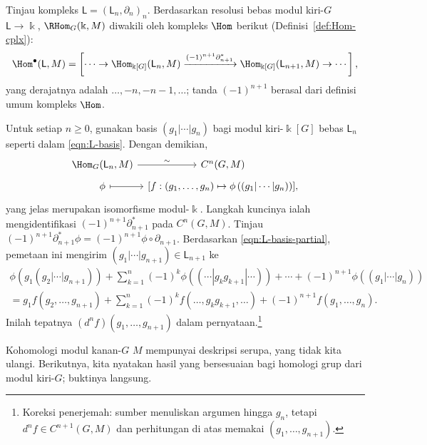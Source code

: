 \begin{bukti}
	Tinjau kompleks $\mathsf{L}=(\mathsf{L}_n,\partial_n)_n$. Berdasarkan
	resolusi bebas modul kiri-$G$ $\mathsf{L}\to\Bbbk$,
	$\RHom_G(\Bbbk,M)$ diwakili oleh kompleks $\Hom$ berikut
	(Definisi~\ref{def:Hom-cplx}):
	\begin{equation*}
		\Hom^\bullet(\mathsf{L}, M) = \left[ \cdots \to \Hom_{\Bbbk[G]}(\mathsf{L}_n, M) \xrightarrow{(-1)^{n+1} \partial_{n+1}^*} \Hom_{\Bbbk[G]}(\mathsf{L}_{n+1}, M) \to \cdots \right] ,
	\end{equation*}
	yang derajatnya adalah $\ldots,-n,-n-1,\ldots$; tanda $(-1)^{n+1}$
	berasal dari definisi umum kompleks $\Hom$.
	
	Untuk setiap $n\geq0$, gunakan basis
	$(g_1|\cdots|g_n)$ bagi modul kiri-$\Bbbk[G]$ bebas $\mathsf{L}_n$
	seperti dalam \eqref{eqn:L-basis}. Dengan demikian,
	\[\begin{tikzcd}[row sep=tiny, column sep=tiny]
		\Hom_G(\mathsf{L}_n, M) \arrow[r, "\sim"] & C^n(G, M) \\
		\phi \arrow[mapsto, r] & {\left[ f: (g_1, \ldots, g_n) \mapsto \phi\left( (g_1 | \cdots | g_n) \right)\right]} ,
	\end{tikzcd}\]
	yang jelas merupakan isomorfisme modul-$\Bbbk$. Langkah kuncinya ialah
	mengidentifikasi $(-1)^{n+1}\partial_{n+1}^*$ pada $C^n(G,M)$. Tinjau
	$(-1)^{n+1}\partial_{n+1}^*\phi=(-1)^{n+1}\phi\circ\partial_{n+1}$.
	Berdasarkan \eqref{eqn:L-basis-partial}, pemetaan ini mengirim
	$(g_1|\cdots|g_{n+1})\in\mathsf{L}_{n+1}$ ke
	\begin{multline*}
		\phi\left( g_1 (g_2 | \cdots | g_{n+1})\right) + \sum_{k=1}^n (-1)^k \phi\left((\cdots | g_k g_{k+1}| \cdots)\right) + \cdots + (-1)^{n+1} \phi\left((g_1 | \cdots |g_n)\right) \\
		= g_1 f(g_2, \ldots, g_{n+1}) + \sum_{k=1}^n (-1)^k f(\ldots, g_k g_{k+1}, \ldots) + (-1)^{n+1} f(g_1, \ldots, g_n).
	\end{multline*}
	Inilah tepatnya $(d^nf)(g_1,\ldots,g_{n+1})$ dalam
	pernyataan.\footnote{Koreksi penerjemah: sumber menuliskan argumen hingga
	$g_n$, tetapi $d^nf\in C^{n+1}(G,M)$ dan perhitungan di atas memakai
	$(g_1,\ldots,g_{n+1})$.}
\end{bukti}

Kohomologi modul kanan-$G$ $M$ mempunyai deskripsi serupa, yang tidak kita
ulangi. Berikutnya, kita nyatakan hasil yang bersesuaian bagi homologi grup
dari modul kiri-$G$; buktinya langsung.


